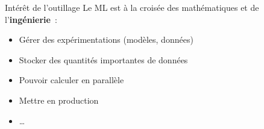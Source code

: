 \begin{frame}{Intérêt de l'outillage}
  Le ML est à la croisée des mathématiques et de l'\textbf{ingénierie}~:
  \begin{itemize}[<+->]
    \item Gérer des expérimentations (modèles, données)
    \item Stocker des quantités importantes de données
    \item Pouvoir calculer en parallèle
    \item Mettre en production
    \item …
  \end{itemize}
\end{frame}
